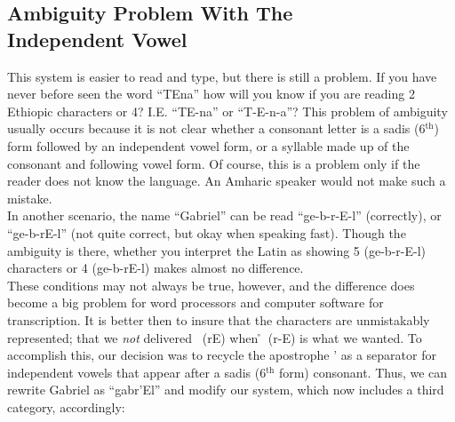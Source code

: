 \subsection[nothing]{Ambiguity Problem With The \\ Independent Vowel} \label{sec:amb}
 
 This system is easier to read and type, but there is still a problem.  If
 you have never before seen the word ``TEna'' how will you know if you
 are reading 2 Ethiopic characters or 4?  I.E. ``TE-na'' or ``T-E-n-a''?  This problem
 of ambiguity usually occurs because it is not clear whether a consonant
 letter is a sadis (6$^{\textrm{th}}$) form followed by an independent vowel form, or a
 syllable made up of the consonant and following vowel form.  Of course, this
 is a problem only if the reader does not know the language.  An Amharic
 speaker would not make such a mistake.   \\
 
 In another scenario, the name ``Gabriel'' can be read ``ge-b-r-E-l'' (correctly),
 or ``ge-b-rE-l'' (not quite correct, but okay when speaking fast).  Though the
 ambiguity is there, whether you interpret the Latin as showing 5 (ge-b-r-E-l)
 characters or 4 (ge-b-rE-l) makes almost no difference.   \\
 
 These conditions may not always be true, however, and the difference does
 become a big problem for word processors and computer software for
 transcription.  It is better then to insure that the characters are
 unmistakably represented; that we \emph{not} delivered \rE \ (rE) when \r\E \ 
 (r-E) is what we wanted.  To accomplish this, our decision was to recycle
 the apostrophe ' as a separator for independent vowels that appear after a 
 sadis (6$^{\textrm{th}}$ form) consonant.  Thus, we can rewrite Gabriel as ``gabr'El'' and
 modify our system, which now includes a third category, accordingly:
 
